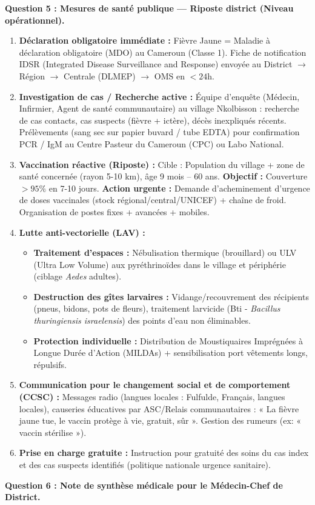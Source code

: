 \documentclass[11pt]{article}
\begin{document}
\begin{exoresolu}
\textbf{Question 5 : Mesures de santé publique — Riposte district (Niveau opérationnel).}

\begin{enumerate}
    \item \textbf{Déclaration obligatoire immédiate :} Fièvre Jaune = Maladie à déclaration obligatoire (MDO) au Cameroun (Classe 1). Fiche de notification IDSR (Integrated Disease Surveillance and Response) envoyée au District $\rightarrow$ Région $\rightarrow$ Centrale (DLMEP) $\rightarrow$ OMS en $< 24$h.
    \item \textbf{Investigation de cas / Recherche active :} Équipe d'enquête (Médecin, Infirmier, Agent de santé communautaire) au village Nkolbisson : recherche de cas contacts, cas suspects (fièvre + ictère), décès inexpliqués récents. Prélèvements (sang sec sur papier buvard / tube EDTA) pour confirmation PCR / IgM au Centre Pasteur du Cameroun (CPC) ou Labo National.
    \item \textbf{Vaccination réactive (Riposte) :} Cible : Population du village + zone de santé concernée (rayon 5-10 km), âge 9 mois -- 60 ans. \textbf{Objectif :} Couverture $> 95 \%$ en 7-10 jours. \textbf{Action urgente :} Demande d'acheminement d'urgence de doses vaccinales (stock régional/central/UNICEF) + chaîne de froid. Organisation de postes fixes + avancées + mobiles.
    \item \textbf{Lutte anti-vectorielle (LAV) :} \begin{itemize}
        \item \textbf{Traitement d'espaces :} Nébulisation thermique (brouillard) ou ULV (Ultra Low Volume) aux pyréthrinoïdes dans le village et périphérie (ciblage \emph{Aedes} adultes).
        \item \textbf{Destruction des gîtes larvaires :} Vidange/recouvrement des récipients (pneus, bidons, pots de fleurs), traitement larvicide (Bti - \emph{Bacillus thuringiensis israelensis}) des points d'eau non éliminables.
        \item \textbf{Protection individuelle :} Distribution de Moustiquaires Imprégnées à Longue Durée d'Action (MILDAs) + sensibilisation port vêtements longs, répulsifs.
    \end{itemize}
    \item \textbf{Communication pour le changement social et de comportement (CCSC) :} Messages radio (langues locales : Fulfulde, Français, langues locales), causeries éducatives par ASC/Relais communautaires : « La fièvre jaune tue, le vaccin protège à vie, gratuit, sûr ». Gestion des rumeurs (ex: « vaccin stérilise »).
    \item \textbf{Prise en charge gratuite :} Instruction pour gratuité des soins du cas index et des cas suspects identifiés (politique nationale urgence sanitaire).
\end{enumerate}

\textbf{Question 6 : Note de synthèse médicale pour le Médecin-Chef de District.}

\end{exoresolu}
\end{document}
